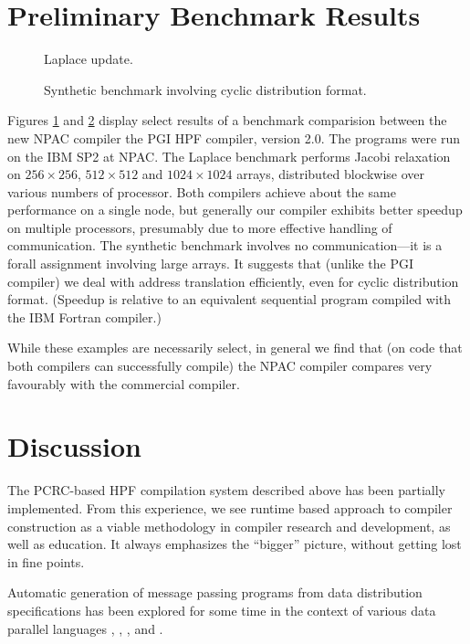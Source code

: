 \section{Preliminary Benchmark Results\label{benchmarks}}

\begin{figure}[tb]
\centerline{}
\caption{Laplace update.}
\label{bench1}
\end{figure}

\begin{figure}[tb]
\centerline{}
\caption{Synthetic benchmark involving cyclic distribution format.}
\label{bench2}
\end{figure}

Figures \ref{bench1} and \ref{bench2} display select results of a
benchmark comparision between the new NPAC compiler the PGI HPF
compiler, version 2.0.  The programs were run on the IBM SP2 at NPAC.
The Laplace benchmark performs Jacobi relaxation on $256 \times 256$,
$512 \times 512$ and $1024 \times 1024$ arrays, distributed blockwise
over various numbers of processor.  Both compilers achieve about the
same performance on a single node, but generally our compiler exhibits
better speedup on multiple processors, presumably due to more effective
handling of communication.  The synthetic benchmark involves no
communication---it is a forall assignment involving large arrays.  It
suggests that (unlike the PGI compiler) we deal with address
translation efficiently, even for cyclic distribution format.  (Speedup
is relative to an equivalent sequential program compiled with the IBM
Fortran compiler.)

While these examples are necessarily select, in general we find that
(on code that both compilers can successfully compile) the NPAC compiler
compares very favourably with the commercial compiler.


\section{Discussion\label{discussion}}

The PCRC-based HPF compilation system described above has been
partially implemented.  From this experience, we see runtime
based approach to compiler construction as a viable methodology
in compiler research and development, as well as education.  It 
always emphasizes the ``bigger'' picture, without getting lost in 
fine points.

Automatic generation of message passing programs from data distribution
specifications has been explored for some time in the context of
various data parallel languages \cite{Cal88}, \cite{Rog89},
\cite{Koe91}, \cite{Tes93} and \cite{Hir94}.

